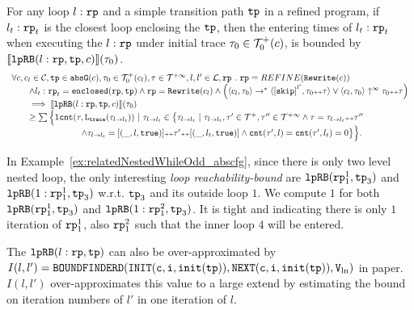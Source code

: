 \begin{lem}
  \label{lem:looprb-sound}
  For any loop $l: \mathtt{rp}$ and a simple transition path $\mathtt{tp}$ in a refined program, if $l_t: \mathtt{rp}_t$ is the closest loop enclosing the $\mathtt{tp}$, then the entering times of $l_t: \mathtt{rp}_t$ when executing the $l: \mathtt{rp}$ under initial trace $\mathtt{\tau}_0 \in \mathcal{T}^{+}_0(c)$, is bounded by $\llbracket \mathtt{lpRB}(l: \mathtt{rp}, \mathtt{tp}, c) \rrbracket(\mathtt{\tau}_0)$.
  \[
    \begin{array}{l}
    \forall c, c_l \in \cdom, \tpath \in \absG(c), \trace_0 \in \ftdom_0(c_l), \trace \in \tdom, l, l' \in \ldom, \rprog \st 
    \rprog = REFINE(\algrewrite(c))
    \\ \qquad
    \land l_t: \rprog_t = \kw{enclosed}(\rprog, \tpath)
    \land 
    \rprog = \algrewrite(c_l)
    \land
    \Big(
    \config{c_l, \trace_0} \to^* \config{\clabel{\eskip}^{l'}, \trace_0 \tracecat \trace}
    \lor \config{c_l, \trace_0} \uparrow^{\infty} \trace_0 \tracecat \trace 
    \Big)
    \\ \qquad
    \implies
    \econfig{\lpchB(l: \rprog, \tpath, c)}(\trace_0) 
    \\ \qquad \geq 
      \sum\Big\{
      \lcounter(\trace, \tracel(\trace_{l \to l_t})) ~\vert~ \trace_{l \to l_t} \in 
      \big\{\trace_{l \to l_t} ~\vert~ 
      \trace_{l \to l_t}, \trace' \in \ftdom, \trace'' \in \tdom
      \land \trace = \trace_{l \to l_t} \tracecat \trace''
      \\ \qquad \qquad \qquad \qquad
      \land \trace_{l \to l_t} = [(\_, l, \etrue)] \tracecat \trace' \tracecat [(\_, l_t, \etrue)]
      \land \counter(\trace', l) = \counter(\trace', l_t) = 0 
      \big\}
      \Big\}.
\end{array}
  \]
\end{lem}
%
In Example~\ref{ex:relatedNestedWhileOdd_abscfg}, since there is only two level nested loop,
the only interesting \emph{loop reachability-bound} are $\mathtt{lpRB}(\mathtt{rp}_1^1, \mathtt{tp}_3)$ and $\mathtt{lpRB}(1: \mathtt{rp}_1^1, \mathtt{tp}_3)$ 
w.r.t. $\mathtt{tp}_3$ and its outside loop $1$.
We compute $1$ for both $\mathtt{lpRB}(\mathtt{rp}_1^1, \mathtt{tp}_3)$ and $\mathtt{lpRB}(1: \mathtt{rp}_1^2, \mathtt{tp}_3)$. It is tight and indicating there is only $1$ iteration of $\mathtt{rp}_1^1$, also $\mathtt{rp}_1^2$ such that the inner loop $4$ will be entered.

The $\mathtt{lpRB}(l:\mathtt{rp}, \mathtt{tp})$ 
can also be over-approximated by
$I(l, l') = \mathtt{BOUNDFINDERD(INIT(c, i, \mathtt{init}(\mathtt{tp})), NEXT(c, i, \mathtt{init}(\mathtt{tp})), V_{\ln})}$ in paper\cite{GulwaniJK09}.
$I(l, l')$ over-approximates this value to a large extend 
by estimating the bound on iteration numbers of $l'$ in one iteration of $l$.
